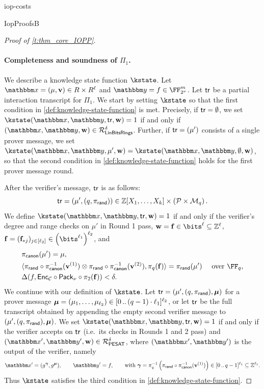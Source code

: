 \begin{lncsappendix}{iop-costs}
\begin{lncsmove}{IopProofsB}
\begin{proof}[Proof of \cref{t:thm_core_IOPP}]
\paragraph{Completeness and soundness of $\Pi_1$.}
We describe a knowledge state function $\kstate$. Let $\inp=(\mu,\vv)\in \evalfield \times \evalfield^{\codedim}$ and  $\oracle=f\in \comfield^{\codelength}$. Let $\mathsf{tr}$ be a partial interaction transcript for $\Pi_1$. We start by setting $\kstate$ so that the first  condition in \cref{def:knowledge-state-function} is met. Precisely, if   $\mathsf{tr}=\emptyset$, we set $\kstate(\inp,\lncsbreak\oracle,\lncsbreak\tr,\ww) = 1$ if and only if $(\inp, \oracle, \ww)\in \LinBitsDual^{\delta}$. Further,  if $\mathsf{tr}=(\mu')$ consists of a single prover message, we set $\kstate(\inp,\lncsbreak\oracle,\lncsbreak\mu',\ww)=\kstate(\inp,\lncsbreak\oracle,\lncsbreak\emptyset,\ww)$, so that the second condition in \cref{def:knowledge-state-function} holds for the first prover message round.

After the verifier's message, $\mathsf{tr}$ is as follows:
%
$$
\mathsf{tr}=(\mu', (q,\pi_{\mathsf{rand}})) \in \mathbb{Z}[X_1, \ldots, X_{k}] \times \left(\mathcal{P} \times \mathcal{M}_q\right).
$$
%
We define $\kstate(\inp,\lncsbreak\oracle,\lncsbreak\tr,\ww)=1$ if and only if  the verifier's degree and range checks on $\mu'$ in Round 1 pass,  $\ww=\bff\in \bits^{\codedim}\subseteq \ZZ^\codedim$,  $\bff=(\bff_{*j})_{j\in [\codedim_2]}\in \left(\bits^{\codedim_1}\right)^{\codedim_2}$, and
%
\begin{equation}\label{e:core_iop_proof_eq1}
    \begin{aligned}
&\picanon(\mu')=\mu,\\
&\langle \pirand\circ \picanon^{-1}(\vv^{(1)}) \otimes \pirand\circ \picanon^{-1}(\vv^{(2)}), \pi_q(\bff)\rangle = \pirand(\mu') \quad \text{ over } \FF_q,\\
&\hamming(f,\Enc_{\cC}\circ\pack\circ \pi_2(\bff))< \delta.
    \end{aligned}
\end{equation}
%
We continue with our definition of $\kstate$.  Let $\mathsf{tr}=(\mu', (q,\pi_{\mathsf{rand}}), \bm{\mu})$ for a prover message $\bm{\mu}=(\mu_1,\ldots, \mu_{\ell_2})\in [0 \, .. \, (q-1)\cdot \ell_1]^{\ell_2}$, or let $\mathsf{tr}$ be the full transcript obtained by appending the empty second verifier message to $(\mu', (q,\pi_{\mathsf{rand}}), \bm{\mu})$. We set $\kstate(\inp,\lncsbreak\oracle,\lncsbreak\tr,\ww)=1$ if and only if the verifier accepts on $\mathsf{tr}$ (i.e.\ its checks in Rounds 1 and 2 pass) and $(\inp',\oracle',\ww)\in \PESAT^{\delta}$, where $(\inp',\oracle')$ is the output of the verifier, namely
%
\iflncs\begingroup\small\fi
$$
\inp'=(g^{\bm{\gamma}}, g^{\bm{\mu}}), \qquad \oracle'= f, \qquad \text{with } \bm{\gamma} = \pi_{q}^{-1}\left(\pirand\circ \picanon^{-1}(\vv^{(1)})\right) \in \range{0}{q-1}^{\codedim_1}\subseteq \ZZ^{\codedim_1}.
$$
\iflncs\endgroup\fi
%
 Thus $\kstate$ satisfies the third condition in \cref{def:knowledge-state-function}.




\end{proof}
\end{lncsmove}
\end{lncsappendix}
